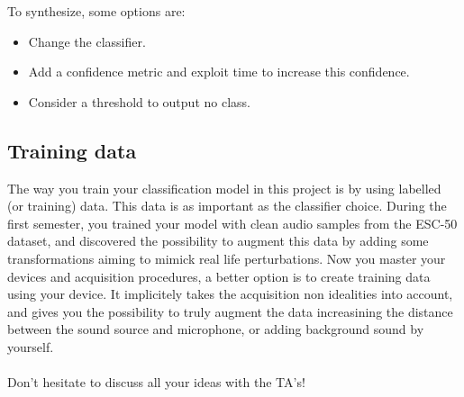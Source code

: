 To synthesize, some options are:
\begin{itemize}
    \item Change the classifier.
    \item Add a confidence metric and exploit time to increase this confidence.
    \item Consider a threshold to output no class.
\end{itemize}

\subsection{Training data}

The way you train your classification model in this project is by using labelled (or training) data. This data is as important as the classifier choice. During the first semester, you trained your model with clean audio samples from the ESC-50 dataset, and discovered the possibility to augment this data by adding some transformations aiming to mimick real life perturbations. Now you master your devices and acquisition procedures, a better option is to create training data using your device. It implicitely takes the acquisition non idealities into account, and gives you the possibility to truly augment the data increasining the distance between the sound source and microphone, or adding background sound by yourself. \\
\\ 
Don't hesitate to discuss all your ideas with the TA's!